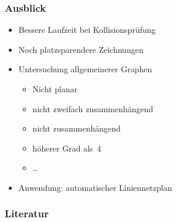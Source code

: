 \documentclass{beamer}
\begin{document}




\begin{frame}
  \frametitle{Ausblick}
  \begin{itemize}[<+->]
    \item Bessere Laufzeit bei Kollisionsprüfung
    \item Noch platzsparendere Zeichnungen
    \item Untersuchung allgemeinerer Graphen
      \begin{itemize}[<+->]
        \item Nicht planar
        \item nicht zweifach zusammenhängend
        \item nicht zusammenhängend
        \item höherer Grad als~4
        \item \dots
      \end{itemize}
    \item Anwendung: automatischer Liniennetzplan
  \end{itemize}
\end{frame}


\begin{frame}[shrink=30]
  \frametitle{Literatur}
  
  \small
\end{frame}
\end{document}
